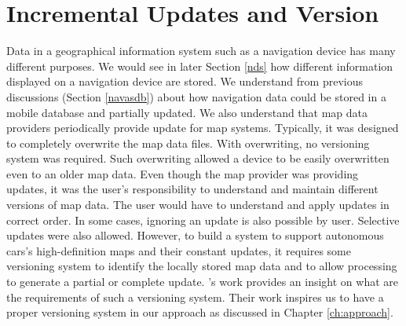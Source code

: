 \section{Incremental Updates and Version}
Data in a geographical information system such as a navigation device has many different purposes. We would see in later Section \ref{nds} how different information displayed on a navigation device are stored. We understand from previous discussions (Section \ref{navasdb}) about how navigation data could be stored in a mobile database and partially updated. We also understand that map data providers periodically provide update for map systems. Typically, it was designed to completely overwrite the map data files. With overwriting, no versioning system was required. Such overwriting allowed a device to be easily overwritten even to an older map data. Even though the map provider was providing updates, it was the user's responsibility to understand and maintain different versions of map data. The user would have to understand and apply updates in correct order. In some cases, ignoring an update is also possible by user. Selective updates were also allowed. However, to build a system to support autonomous cars's high-definition maps and their constant updates, it requires some versioning system to identify the locally stored map data and to allow processing to generate a partial or complete update. \citet{cooper2001incremental}'s work provides an insight on what are the requirements of such a versioning system. Their work inspires us to have a proper versioning system in our approach as discussed in Chapter \ref{ch:approach}. \\


